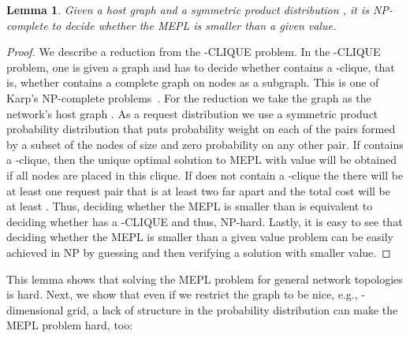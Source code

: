 \documentclass[conference]{IEEEtran}
\newtheorem{lemma}{Lemma}
\begin{document}
\begin{lemma}
Given a host graph  and a symmetric product distribution , it is NP-complete to decide whether the MEPL is smaller than a given value.  
\end{lemma}
\begin{proof}
We describe a reduction from the -CLIQUE problem. In the -CLIQUE problem, one is given a graph  and has to decide whether  contains a -clique, that is, whether  contains a complete graph on  nodes as a subgraph. This is one of Karp's  NP-complete problems~\cite{karp1972reducibility}. For the reduction we take the graph  as the network's host graph . As a request distribution we use a symmetric product probability distribution that puts  probability weight on each of the pairs  formed by a subset of the nodes of size  and zero probability on any other pair. If  contains a -clique, then the unique optimal solution to MEPL with value  will be obtained if all  nodes are placed in this clique. If  does not contain a -clique the there will be at least one request pair  that is at least two far apart and the total cost will be at least . Thus, deciding whether the MEPL is smaller than  is equivalent to deciding whether  has a -CLIQUE and thus, NP-hard. Lastly, it is easy to see that deciding whether the MEPL is smaller than a given value problem can be easily achieved in NP by guessing and then verifying a solution with smaller value.  
\end{proof}

This lemma shows that solving the MEPL problem for general network topologies is hard. Next, we show that even if we restrict the graph to be nice, e.g., -dimensional grid, a lack of structure in the probability distribution can make the MEPL problem hard, too:
\end{document}
